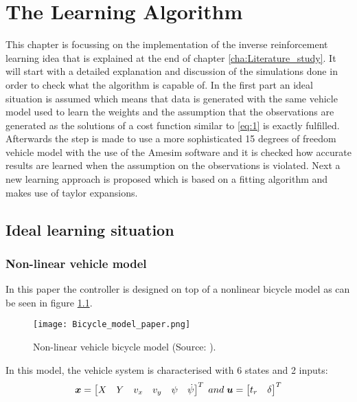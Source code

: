 \chapter{The Learning Algorithm\\}
\label{cha:Learning_algorithm}

This chapter is focussing on the implementation of the inverse reinforcement learning idea that is explained at the end of chapter \ref{cha:Literature_study}. It will start with a detailed explanation and discussion of the simulations done in order to check what the algorithm is capable of. In the first part an ideal situation is assumed which means that data is generated with the same vehicle model used to learn the weights and the assumption that the observations are generated as the solutions of a cost function similar to \ref{eq:1} is exactly fulfilled. Afterwards the step is made to use a more sophisticated 15 degrees of freedom vehicle model with the use of the Amesim software and it is checked how accurate results are learned when the assumption on the observations is violated. Next a new learning approach is proposed which is based on a fitting algorithm and makes use of taylor expansions. 

\section{Ideal learning situation }

\subsection{Non-linear vehicle model}\label{sec:Vehicle_models}
In this paper the controller is designed on top of a nonlinear bicycle model \cite{TongDuySon2019} as can be seen in figure \ref{fig:bicycle_model}.\\

\begin{figure}[h!]
	\centering
	\texttt{[image: Bicycle\_model\_paper.png]}
	\caption{Non-linear vehicle bicycle model (Source: \cite{TongDuySon2019}).}
	\label{fig:bicycle_model}
\end{figure}

In this model, the vehicle system is characterised with 6 states and 2 inputs:
\begin{equation}\label{eq:bicycle_model}
\centering
\bm{x} = 
\begin{bmatrix}
X & Y & v_x & v_y & \psi & \dot{\psi}
\end{bmatrix}^{T}
\; and \; \bm{u} = 
\begin{bmatrix}
t_r & \delta
\end{bmatrix}^{T}
\end{equation}

